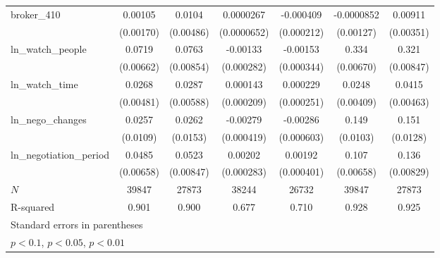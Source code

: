 {\begin{tabular}{l*{6}{c}}
\addlinespace
broker\_410  &     0.00105         &      0.0104\sym{**} &   0.0000267         &   -0.000409\sym{*}  &  -0.0000852         &     0.00911\sym{***}\\
            &   (0.00170)         &   (0.00486)         & (0.0000652)         &  (0.000212)         &   (0.00127)         &   (0.00351)         \\
\addlinespace
ln\_watch\_people&      0.0719\sym{***}&      0.0763\sym{***}&    -0.00133\sym{***}&    -0.00153\sym{***}&       0.334\sym{***}&       0.321\sym{***}\\
            &   (0.00662)         &   (0.00854)         &  (0.000282)         &  (0.000344)         &   (0.00670)         &   (0.00847)         \\
\addlinespace
ln\_watch\_time&      0.0268\sym{***}&      0.0287\sym{***}&    0.000143         &    0.000229         &      0.0248\sym{***}&      0.0415\sym{***}\\
            &   (0.00481)         &   (0.00588)         &  (0.000209)         &  (0.000251)         &   (0.00409)         &   (0.00463)         \\
\addlinespace
ln\_nego\_changes&      0.0257\sym{**} &      0.0262\sym{*}  &    -0.00279\sym{***}&    -0.00286\sym{***}&       0.149\sym{***}&       0.151\sym{***}\\
            &    (0.0109)         &    (0.0153)         &  (0.000419)         &  (0.000603)         &    (0.0103)         &    (0.0128)         \\
\addlinespace
ln\_negotiation\_period&      0.0485\sym{***}&      0.0523\sym{***}&     0.00202\sym{***}&     0.00192\sym{***}&       0.107\sym{***}&       0.136\sym{***}\\
            &   (0.00658)         &   (0.00847)         &  (0.000283)         &  (0.000401)         &   (0.00658)         &   (0.00829)         \\
\midrule
\(N\)       &       39847         &       27873         &       38244         &       26732         &       39847         &       27873         \\
R-squared   &       0.901         &       0.900         &       0.677         &       0.710         &       0.928         &       0.925         \\
\bottomrule
\multicolumn{7}{l}{\footnotesize Standard errors in parentheses}\\
\multicolumn{7}{l}{\footnotesize \sym{*} \(p<0.1\), \sym{**} \(p<0.05\), \sym{***} \(p<0.01\)}\\
\end{tabular}
}
